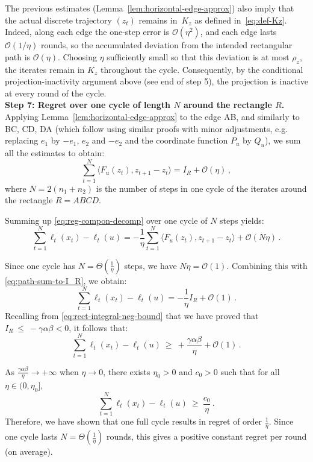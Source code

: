 \documentclass[a4paper,11pt,fullpage]{article}
\theoremstyle{plain}
\theoremstyle{definition}
\theoremstyle{plain}
\renewcommand{\leq}{~\le~}
\renewcommand{\geq}{~\ge~}
\begin{document}
The previous estimates (Lemma~\ref{lem:horizontal-edge-approx}) also imply that the actual discrete trajectory $(z_t)$ remains in~$K_z$ as defined in~\eqref{eq:def-Kz}.
Indeed, along each edge the one-step error is $\mathcal{O}(\eta^2)$, and each edge lasts $\mathcal{O}(1/\eta)$ rounds, so the accumulated deviation from the intended rectangular path is
$\mathcal{O}(\eta)$. Choosing $\eta$ sufficiently small so that this deviation is at most
$\rho_z$, the iterates remain in $K_z$ throughout the cycle. Consequently, by the conditional projection-inactivity argument above (see end of step 5), the projection is inactive at every round of the cycle.\\

\noindent\textbf{Step 7: Regret over one cycle of length $N$ around the rectangle $R$.} Applying Lemma~\ref{lem:horizontal-edge-approx} to the edge AB, and similarly to BC, CD, DA (which follow using similar proofs with minor adjustments, e.g. replacing $e_1$ by $-e_1$, $e_2$ and $-e_2$ and the coordinate function $P_u$ by $Q_u$), we sum all the estimates to obtain: 
\begin{equation*}
\sum_{t=1}^N \langle F_u(z_t), z_{t+1} - z_t \rangle = I_R + \mathcal{O}(\eta)\,,
\end{equation*}
where $N = 2(n_1 + n_2)$ is the number of steps in one cycle of the iterates around the rectangle $R = ABCD.$ 

Summing up \eqref{eq:reg-compon-decomp} over one cycle of $N$ steps yields: 
\begin{equation}
\label{eq:path-sum-to-I_R}
\sum_{t=1}^N \ell_t(x_t) - \ell_t(u) = - \frac{1}{\eta} \sum_{t=1}^N \langle F_u(z_t), z_{t+1} - z_t \rangle + \mathcal{O}(N \eta)\,.
\end{equation}

Since one cycle has $N = \Theta(\frac{1}{\eta})$ steps, we have $N \eta = \mathcal{O}(1)$. Combining this with \eqref{eq:path-sum-to-I_R}, we obtain: 
\begin{equation*}
\sum_{t=1}^N \ell_t(x_t) - \ell_t(u) = - \frac{1}{\eta} I_R + \mathcal{O}(1)\,.
\end{equation*}
Recalling from \eqref{eq:rect-integral-neg-bound} that we have proved that $I_R \leq - \gamma \alpha \beta < 0$, it follows that: 
\begin{equation*}
\sum_{t=1}^N \ell_t(x_t) - \ell_t(u) \geq + \frac{\gamma \alpha \beta} {\eta} + \mathcal{O}(1)\,.
\end{equation*}

As $\frac{\gamma \alpha \beta}{\eta} \to +\infty$ when $\eta \to 0$, there exists $\eta_0 > 0$ and $c_0 > 0$ such that for all $\eta \in (0, \eta_0]$,  
\begin{equation}
\label{eq:per-cycle-regret-bound}
\sum_{t=1}^N \ell_t(x_t) - \ell_t(u) \geq \frac{c_0}{\eta}\,. 
\end{equation} 
Therefore, we have shown that one full cycle results in regret of order $\frac{1}{\eta}$. Since one cycle lasts $N = \Theta(\frac{1}{\eta})$ rounds, this gives a positive constant regret per round (on average).\\
\end{document}
